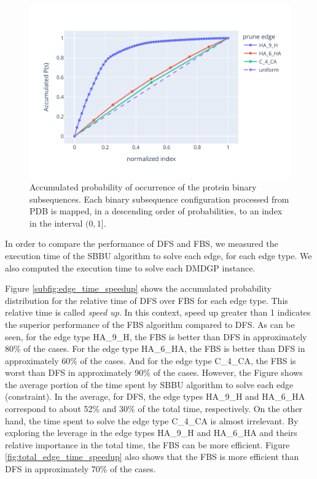 \documentclass[journal=jacsat,manuscript=article]{achemso}
\begin{document}
\begin{figure}[H]
	    \includegraphics[scale=0.8]{Figures/prune_edges_acc_prob.svg}
\caption{\normalsize Accumulated probability of occurrence of the protein binary subsequences. Each binary subsequence configuration processed from PDB is mapped, in a descending order of probabilities, to an index in the interval $(0, 1]$.}\label{fig:prune_edges_acc_prob}
\end{figure}

In order to compare the performance of DFS and FBS, we measured the execution time of the SBBU algorithm to solve each edge, for each edge type. We also computed the execution time to solve each DMDGP instance.

Figure \ref{subfig:edge_time_speedup} shows the accumulated probability distribution for the relative time of DFS over FBS for each edge type. This relative time is called \textit{speed up}. In this context, speed up greater than 1 indicates the superior performance of the FBS algorithm compared to DFS. As can be seen, for the edge type HA\_9\_H, the FBS is better than DFS in approximately 80\% of the cases. For the edge type HA\_6\_HA, the FBS is better than DFS in approximately 60\% of the cases. And for the edge type C\_4\_CA, the FBS is worst than DFS in approximately 90\% of the cases. However, the Figure shows the average portion of the time spent by SBBU algorithm to solve each edge (constraint).  In the average, for DFS, the edge types HA\_9\_H and HA\_6\_HA correspond to about 52\% and 30\% of the total time, respectively. On the other hand, the time spent to solve the edge type C\_4\_CA is almost irrelevant. By exploring the leverage in the edge types HA\_9\_H and HA\_6\_HA and theirs relative importance in the total time, the FBS can be more efficient. Figure \ref{fig:total_edge_time_speedup} also shows that the FBS is more efficient than DFS in approximately 70\% of the cases.
\end{document}
